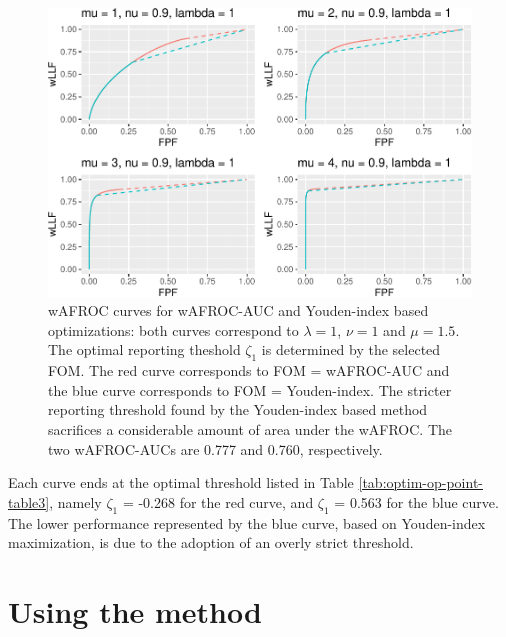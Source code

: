 \documentclass[
]{book}
\begin{document}
\begin{figure}
\centering
\includegraphics{21-optim-op-point_files/figure-latex/optim-op-point-vary-mu-wafroc-1.pdf}
\caption{\label{fig:optim-op-point-vary-mu-wafroc}wAFROC curves for wAFROC-AUC and Youden-index based optimizations: both curves correspond to \(\lambda = 1\), \(\nu = 1\) and \(\mu = 1.5\). The optimal reporting theshold \(\zeta_1\) is determined by the selected FOM. The red curve corresponds to FOM = wAFROC-AUC and the blue curve corresponds to FOM = Youden-index. The stricter reporting threshold found by the Youden-index based method sacrifices a considerable amount of area under the wAFROC. The two wAFROC-AUCs are 0.777 and 0.760, respectively.}
\end{figure}

Each curve ends at the optimal threshold listed in Table \ref{tab:optim-op-point-table3}, namely \(\zeta_1\) = -0.268 for the red curve, and \(\zeta_1\) = 0.563 for the blue curve. The lower performance represented by the blue curve, based on Youden-index maximization, is due to the adoption of an overly strict threshold.

\hypertarget{optim-op-point-how-to-use-method}{%
\section{Using the method}\label{optim-op-point-how-to-use-method}}
\end{document}
